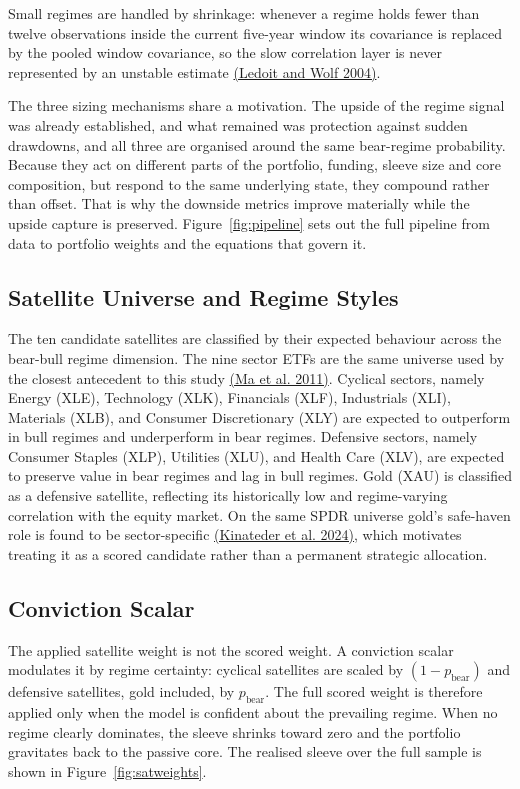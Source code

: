 \documentclass[11pt, a4paper]{article}
\newcommand{\cit}[2]{\hyperlink{ref:#1}{\textcolor{elsblue}{#2}}}
\begin{document}
Small regimes are handled by shrinkage: whenever a regime holds fewer than twelve
observations inside the current five-year window its covariance is replaced by the pooled
window covariance, so the slow correlation layer is never represented by an unstable
estimate \cit{ledoit2004}{(Ledoit and Wolf 2004)}.

The three sizing mechanisms share a motivation. The upside of the regime signal was already
established, and what remained was protection against sudden drawdowns, and all three are organised
around the same bear-regime probability. Because they act on different parts of the portfolio,
funding, sleeve size and core composition, but respond to the same underlying state, they
compound rather than offset. That is why the downside metrics improve materially while the
upside capture is preserved.
Figure~\ref{fig:pipeline} sets out the full pipeline from data to portfolio weights and the
equations that govern it.



\subsection{Satellite Universe and Regime Styles}

The ten candidate satellites are classified by their expected behaviour across the
bear-bull regime dimension. The nine sector ETFs are the same universe used by the closest antecedent to this study \cit{ma2011}{(Ma et al. 2011)}. Cyclical sectors, namely Energy (XLE), Technology (XLK), Financials
(XLF), Industrials (XLI), Materials (XLB), and Consumer Discretionary (XLY) are expected
to outperform in bull regimes and underperform in bear regimes. Defensive sectors, namely Consumer
Staples (XLP), Utilities (XLU), and Health Care (XLV), are expected to preserve value in
bear regimes and lag in bull regimes. Gold (XAU) is classified as a defensive satellite,
reflecting its historically low and regime-varying correlation with the equity market.
On the same SPDR universe gold's safe-haven role is found to be sector-specific
\cit{kinateder2024}{(Kinateder et al. 2024)}, which motivates treating it as a scored
candidate rather than a permanent strategic allocation.

\subsection{Conviction Scalar}

The applied satellite weight is not the scored weight. A conviction scalar modulates it by
regime certainty: cyclical satellites are scaled by $(1-p_{\text{bear}})$ and defensive
satellites, gold included, by $p_{\text{bear}}$. The full scored weight is therefore applied
only when the model is confident about the prevailing regime. When no regime clearly dominates,
the sleeve shrinks toward zero and the portfolio gravitates back to the passive core. The realised sleeve over
the full sample is shown in Figure~\ref{fig:satweights}.
\end{document}
